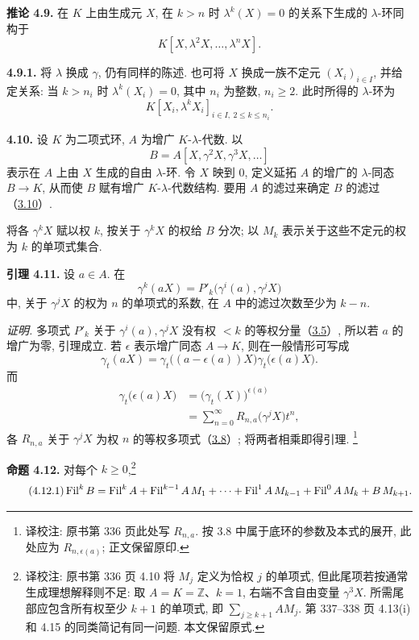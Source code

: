 \textbf{推论 4.9.} 在 \(K\) 上由生成元 \(X\), 在 \(k>n\) 时 \(\lambda^k(X)=0\) 的关系下生成的 \(\lambda\)-环同构于
\[
 K[X,\lambda^2X,\ldots,\lambda^nX].
\]

\textbf{4.9.1.} 将 \(\lambda\) 换成 \(\gamma\), 仍有同样的陈述. 也可将 \(X\) 换成一族不定元 \((X_i)_{i\in I}\), 并给定关系: 当 \(k>n_i\) 时 \(\lambda^k(X_i)=0\), 其中 \(n_i\) 为整数, \(n_i\ge2\). 此时所得的 \(\lambda\)-环为
\[
 K[X_i,\lambda^kX_i]_{i\in I,\ 2\le k\le n_i}.
\]

\textbf{4.10.} 设 \(K\) 为二项式环, \(A\) 为增广 \(K\)-\(\lambda\)-代数. 以
\[
 B=A[X,\gamma^2X,\gamma^3X,\ldots]
\]
表示在 \(A\) 上由 \(X\) 生成的自由 \(\lambda\)-环. 令 \(X\) 映到 \(0\), 定义延拓 \(A\) 的增广的 \(\lambda\)-同态 \(B\to K\), 从而使 \(B\) 赋有增广 \(K\)-\(\lambda\)-代数结构. 要用 \(A\) 的滤过来确定 \(B\) 的滤过（\hyperlink{sga6.e05.para.3-10}{3.10}）.

将各 \(\gamma^kX\) 赋以权 \(k\), 按关于 \(\gamma^kX\) 的权给 \(B\) 分次; 以 \(M_k\) 表示关于这些不定元的权为 \(k\) 的单项式集合.

\textbf{引理 4.11.} 设 \(a\in A\). 在
\[
 \gamma^k(aX)=P'_k\bigl(\gamma^i(a),\gamma^jX\bigr)
\]
中, 关于 \(\gamma^jX\) 的权为 \(n\) 的单项式的系数, 在 \(A\) 中的滤过次数至少为 \(k-n\).

\emph{证明.} 多项式 \(P'_k\) 关于 \(\gamma^i(a),\gamma^jX\) 没有权 \(<k\) 的等权分量（\hyperlink{sga6.e05.para.3-5}{3.5}）, 所以若 \(a\) 的增广为零, 引理成立. 若 \(\epsilon\) 表示增广同态 \(A\to K\), 则在一般情形可写成
\[
 \gamma_t(aX)=\gamma_t\bigl((a-\epsilon(a))X\bigr)
                 \gamma_t\bigl(\epsilon(a)X\bigr).
\]
而
\[
\begin{aligned}
 \gamma_t\bigl(\epsilon(a)X\bigr)
  &=\bigl(\gamma_t(X)\bigr)^{\epsilon(a)}\\
  &=\sum_{n=0}^{\infty}R_{n,a}\bigl(\gamma^jX\bigr)t^n,
\end{aligned}
\]
各 \(R_{n,a}\) 关于 \(\gamma^jX\) 为权 \(n\) 的等权多项式（\hyperlink{sga6.e05.para.3-8}{3.8}）; 将两者相乘即得引理.
\footnote{译校注: 原书第 336 页此处写 \(R_{n,a}\). 按 3.8 中属于底环的参数及本式的展开, 此处应为 \(R_{n,\epsilon(a)}\); 正文保留原印.}

\textbf{命题 4.12.} 对每个 \(k\ge0\),\footnote{译校注: 原书第 336 页 4.10 将 \(M_j\) 定义为恰权 \(j\) 的单项式, 但此尾项若按通常生成理想解释则不足: 取 \(A=K=\mathbb Z\)、\(k=1\), 右端不含自由变量 \(\gamma^3X\). 所需尾部应包含所有权至少 \(k+1\) 的单项式, 即 \(\sum_{j\geq k+1}A M_j\). 第 337--338 页 4.13(i) 和 4.15 的同类简记有同一问题. 本文保留原式.}
\begin{equation}\tag{4.12.1}
  \operatorname{Fil}^kB=
  \operatorname{Fil}^kA+\operatorname{Fil}^{k-1}A\,M_1+\cdots+\operatorname{Fil}^1A\,M_{k-1}
  +\operatorname{Fil}^0A\,M_k+B\,M_{k+1}.
\end{equation}

